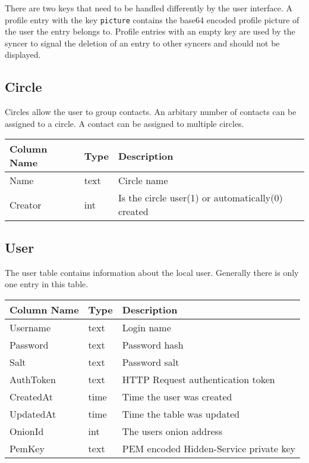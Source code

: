 \documentclass[12pt]{article}
\begin{document}
There are two keys that need to be handled differently by the user interface.
A profile entry with the key \texttt{picture} contains the base64 encoded profile picture of the user the entry belongs to. 
Profile entries with an empty key are used by the syncer to signal the deletion of an entry to other syncers and should not be displayed.

\subsection{Circle}
Circles allow the user to group contacts. An arbitary number of contacts can be assigned to a circle.
A contact can be assigned to multiple circles.
\begin{tabular}{>{\ttfamily}p{}>{\ttfamily}p{}p{}}
Column Name  & Type & Description \\ \hline \hline
Name         & text & Circle name \\
Creator      & int  & Is the circle user(1) or automatically(0) created
\end{tabular}

\subsection{User}
The user table contains information about the local user. Generally there is only one entry in this table.

\begin{tabular}{>{\ttfamily}p{}>{\ttfamily}p{}p{}}
Column Name  & Type & Description \\ \hline \hline
Username     & text & Login name \\
Password     & text & Password hash \\
Salt         & text & Password salt \\
AuthToken    & text & HTTP Request authentication token \\
CreatedAt    & time & Time the user was created \\
UpdatedAt    & time & Time the table was updated \\
OnionId      & int  & The users onion address \\
PemKey       & text & PEM encoded Hidden-Service private key
\end{tabular}
\end{document}

